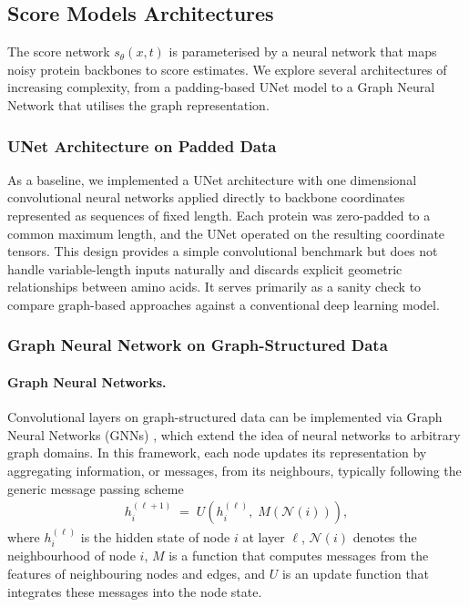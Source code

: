 \documentclass[a4paper,12pt]{article}
\begin{document}
\subsection{Score Models Architectures}\label{subsec:architectures}
The score network \(s_\theta(x,t)\) is parameterised by a neural network that maps noisy protein backbones to score estimates. We explore several architectures of increasing complexity, from a padding-based UNet model to a Graph Neural Network that utilises the graph representation.

\subsubsection{UNet Architecture on Padded Data}
As a baseline, we implemented a UNet architecture \citep{ronneberger2015UNetConvolutionalNetworks} with one dimensional convolutional neural networks applied directly to backbone coordinates represented as sequences of fixed length. Each protein was zero-padded to a common maximum length, and the UNet operated on the resulting coordinate tensors. This design provides a simple convolutional benchmark but does not handle variable-length inputs naturally and discards explicit geometric relationships between amino acids. It serves primarily as a sanity check to compare graph-based approaches against a conventional deep learning model.

\subsubsection{Graph Neural Network on Graph-Structured Data}
\paragraph{Graph Neural Networks.}
Convolutional layers on graph-structured data can be implemented via Graph Neural Networks (GNNs) \citep{scarselliGraphNeuralNetwork2009,gilmer2017NeuralMessagePassing,kipf2017SemiSupervisedClassificationGraph,battaglia2018RelationalInductiveBiases}, which extend the idea of neural networks to arbitrary graph domains. In this framework, each node updates its representation by aggregating information, or messages, from its neighbours, typically following the generic message passing scheme \citep{gilmer2017NeuralMessagePassing}
\begin{align}\label{eq:GNN-message-passing}
    h_i^{(\ell+1)} \;=\; U\!\left(h_i^{(\ell)}, \; M\!\left(\mathcal{N}(i)\right)\right),
\end{align}
where \(h_i^{(\ell)}\) is the hidden state of node \(i\) at layer \(\ell\), \(\mathcal{N}(i)\) denotes the neighbourhood of node \(i\), \(M\) is a function that computes messages from the features of neighbouring nodes and edges, and \(U\) is an update function that integrates these messages into the node state.
\end{document}

